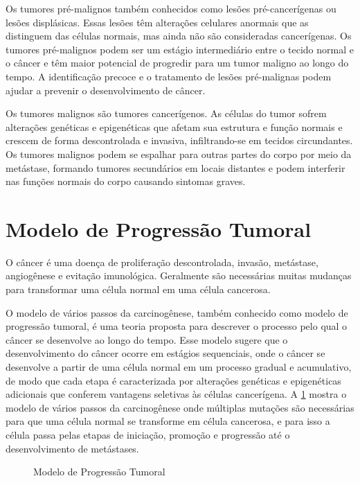 \documentclass[11pt,a4paper]{article}
\begin{document}
    Os \textcolor{CarnationPink}{tumores pré-malignos} também conhecidos como lesões pré-cancerígenas ou lesões displásicas. Essas lesões têm alterações celulares anormais que as distinguem das células normais, mas ainda não são consideradas cancerígenas. Os tumores pré-malignos podem ser um estágio intermediário entre o tecido normal e o câncer e têm maior potencial de progredir para um tumor maligno ao longo do tempo. A identificação precoce e o tratamento de lesões pré-malignas podem ajudar a prevenir o desenvolvimento de câncer.

    Os \textcolor{CarnationPink}{tumores malignos} são tumores cancerígenos. As células do tumor sofrem alterações genéticas e epigenéticas que afetam sua estrutura e função normais e crescem de forma descontrolada e invasiva, infiltrando-se em tecidos circundantes. Os tumores malignos podem se espalhar para outras partes do corpo por meio da metástase, formando tumores secundários em locais distantes e podem interferir nas funções normais do corpo causando sintomas graves. 


\section{Modelo de Progressão Tumoral}

    O câncer é uma doença de proliferação descontrolada, invasão, metástase, angiogênese e evitação imunológica. Geralmente são necessárias muitas mudanças para transformar uma célula normal em uma célula cancerosa. 

    O modelo de vários passos da carcinogênese, também conhecido como modelo de progressão tumoral, é uma teoria proposta para descrever o processo pelo qual o câncer se desenvolve ao longo do tempo. Esse modelo sugere que o desenvolvimento do câncer ocorre em estágios sequenciais, onde o câncer se desenvolve a partir de uma célula normal em um processo gradual e acumulativo, de modo que  cada etapa é caracterizada por alterações genéticas e epigenéticas adicionais que conferem vantagens seletivas às células cancerígena. A \ref{fig:carcinogeneseMultiPassos} mostra o modelo de vários passos da carcinogênese onde múltiplas mutações são necessárias para que uma célula normal se transforme em célula cancerosa, e para isso a célula passa pelas etapas de iniciação, promoção e progressão até o desenvolvimento de metástases.  

    \begin{figure}[h]
        \centering
        \caption{Modelo de Progressão Tumoral}
        \label{fig:carcinogeneseMultiPassos}
    \end{figure}
\end{document}
